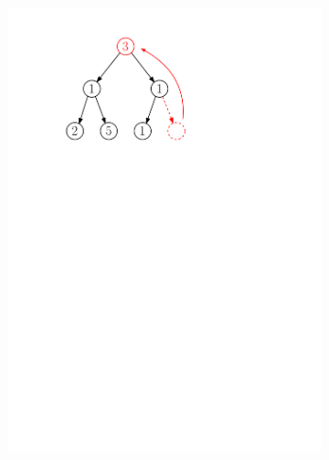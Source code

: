 \begin{figure}[h]
\begin{subfigure}{5cm}
        \includegraphics[scale=.5]{01-grafalgo/images/ch01_odebirani_2}
    \end{subfigure}
    \begin{subfigure}{5cm}

\end{subfigure}
\end{figure}
